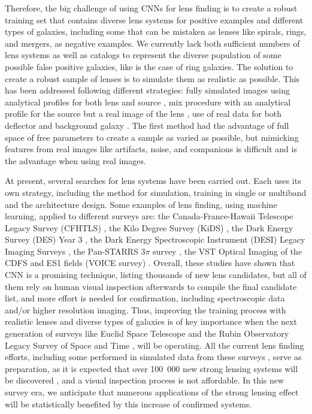 \documentclass[tradiabstract,twocolumn]{aa}
\begin{document}
Therefore, the big challenge of using CNNs for lens finding is to create a robust training set that contains diverse lens systems for positive examples and different types of galaxies, including some that can be mistaken as lenses like spirals, rings, and mergers, as negative examples. We currently lack both sufficient numbers of lens systems as well as catalogs to represent the diverse population of some possible false positive galaxies, like is the case of ring galaxies. The solution to create a robust sample of lenses is to simulate them as realistic as possible. This has been addressed following different strategies: fully simulated images using analytical profiles for both lens and source \citep{Jacobs2019B}, mix procedure with an analytical profile for the source but a real image of the lens \cite{Petrillo2019}, use of real data for both deflector and background galaxy \citep{Canameras2020}. The first method had the advantage of full space of free parameters to create a sample as varied as possible, but mimicking features from real images like artifacts, noise, and companions is difficult and is the advantage when using real images. 

At present, several searches for lens systems have been carried out. Each uses its own strategy, including the method for simulation, training in single or multiband and the architecture design. Some examples of lens finding, using machine learning, applied to different surveys are: the Canada-France-Hawaii Telescope Legacy Survey (CFHTLS) \citep{Jacobs2017}, the Kilo Degree Survey (KiDS) \citep{Petrillo2017,Petrillo2019B,Petrillo2019,He2020}, the Dark Energy Survey (DES) Year 3 \citep{Jacobs2019B,Jacobs2019A} , the Dark Energy Spectroscopic Instrument (DESI) Legacy Imaging Surveys \citep{Huang2020,Huang2021}, the Pan-STARRS 3$\pi$ survey \citep{Canameras2020}, the VST Optical Imaging of the CDFS and ES1 fields (VOICE survey) \citep{Gentile2021}. Overall, these studies have shown that CNN is a promising technique, listing thousands of new lens candidates, but all of them rely on human visual inspection afterwards to compile the final candidate list, and more effort is needed for confirmation, including spectroscopic data and/or higher resolution imaging. Thus, improving the training process with realistic lenses and diverse types of galaxies is of key importance when the next generation of surveys like Euclid Space Telescope \citep{Laureijs2011} and the Rubin Observatory Legacy Survey of Space and Time  \citep[LSST,][]{LSST2009,LSST2019}, will be operating. All the current lens finding efforts, including some performed in simulated data from these surveys \citep{Lanusse2018,Avestruz2019}, serve as preparation, as it is expected that over 100~000 new strong lensing systems will be discovered \citep{Collett2015}, and a visual inspection process is not affordable. In this new survey era, we anticipate that numerous applications of the strong lensing effect will be statistically benefited by this increase of confirmed systems. 
\end{document}
